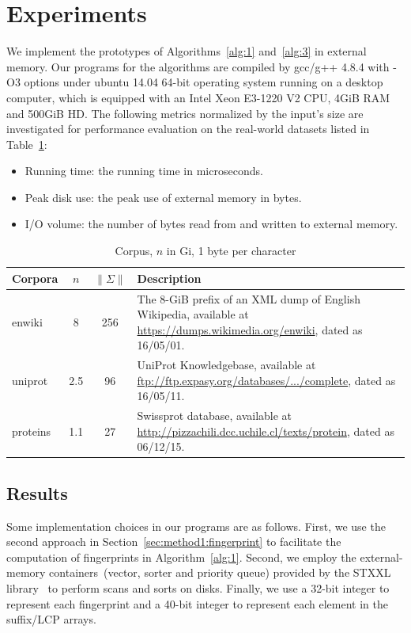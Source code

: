 \documentclass[10pt,journal,compsoc]{IEEEtran}
\begin{document}
	\section{Experiments} \label{sec:experiment}
	
	We implement the prototypes of Algorithms~\ref{alg:1} and~\ref{alg:3} in external memory. Our programs for the algorithms are compiled by gcc/g++ 4.8.4 with -O3 options under ubuntu 14.04 64-bit operating system running on a desktop computer, which is equipped with an Intel Xeon E3-1220 V2 CPU, 4GiB RAM and 500GiB HD. The following metrics normalized by the input's size are investigated for performance evaluation on the real-world datasets listed in Table~\ref{tbl:1}:
	
	\begin{itemize}
		
		\item Running time: the running time in microseconds.
		
		\item Peak disk use: the peak use of external memory in bytes.
		
		\item I/O volume: the number of bytes read from and written to external memory.
		
	\end{itemize}
	
	\renewcommand\arraystretch{1.3}
	\begin{table}[!t]
		\caption{Corpus, $n$ in Gi, 1 byte per character}
		\label{tbl:1}
		\centering
		\begin{tabular}{|l|c|c|p{10cm}|}
			\hline
			Corpora & \multicolumn{1}{c|}{$n$} & \multicolumn{1}{c|}{$\|\Sigma\|$} & Description \\\hline
			enwiki & 8 & 256 & The 8-GiB prefix of an XML dump of English Wikipedia, available at \url{https://dumps.wikimedia.org/enwiki}, dated as 16/05/01. \\\hline	
			uniprot & 2.5 & 96 & UniProt Knowledgebase, available at \url{ftp://ftp.expasy.org/databases/.../complete}, dated as 16/05/11. \\\hline
			proteins & 1.1 & 27 & Swissprot database, available at \url{http://pizzachili.dcc.uchile.cl/texts/protein}, dated as 06/12/15. \\\hline
		\end{tabular}
	\end{table}
	
	\subsection{Results}
	Some implementation choices in our programs are as follows. First, we use the second approach in Section~\ref{sec:method1:fingerprint} to facilitate the computation of fingerprints in Algorithm~\ref{alg:1}. Second, we employ the external-memory containers~(vector, sorter and priority queue) provided by the STXXL library~\cite{Dementiev2007} to perform scans and sorts on disks. Finally, we use a 32-bit integer to represent each fingerprint and a 40-bit integer to represent each element in the suffix/LCP arrays.
	
\end{document}
